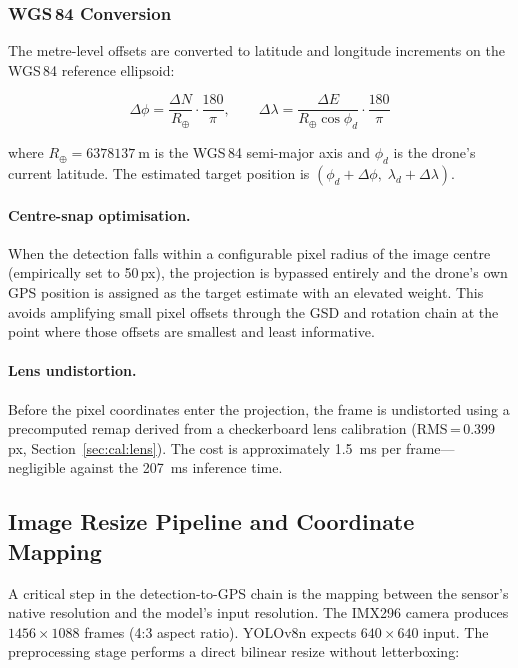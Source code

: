 \subsubsection{WGS\,84 Conversion}

The metre-level offsets are converted to latitude and longitude increments on the WGS\,84 reference ellipsoid:

\begin{equation}\label{eq:wgs84-deep}
  \Delta\phi = \frac{\Delta N}{R_\oplus} \cdot \frac{180}{\pi},
  \qquad
  \Delta\lambda = \frac{\Delta E}{R_\oplus \cos\phi_d} \cdot \frac{180}{\pi}
\end{equation}

\noindent where $R_\oplus = \SI{6378137}{\metre}$ is the WGS\,84 semi-major axis and $\phi_d$ is the drone's current latitude.  The estimated target position is $(\phi_d + \Delta\phi,\; \lambda_d + \Delta\lambda)$.

\paragraph{Centre-snap optimisation.}  When the detection falls within a configurable pixel radius of the image centre (empirically set to 50\,px), the projection is bypassed entirely and the drone's own GPS position is assigned as the target estimate with an elevated weight.  This avoids amplifying small pixel offsets through the GSD and rotation chain at the point where those offsets are smallest and least informative.

\paragraph{Lens undistortion.}  Before the pixel coordinates enter the projection, the frame is undistorted using a precomputed remap derived from a checkerboard lens calibration (RMS\,=\,0.399\,px, Section~\ref{sec:cal:lens}).  The cost is approximately \SI{1.5}{\milli\second} per frame---negligible against the \SI{207}{\milli\second} inference time.

\subsection{Image Resize Pipeline and Coordinate Mapping}\label{sec:resize-pipeline}

A critical step in the detection-to-GPS chain is the mapping between the sensor's native resolution and the model's input resolution.  The IMX296 camera produces $1456 \times 1088$ frames (4:3 aspect ratio).  YOLOv8n expects $640 \times 640$ input.  The preprocessing stage performs a direct bilinear resize without letterboxing:

